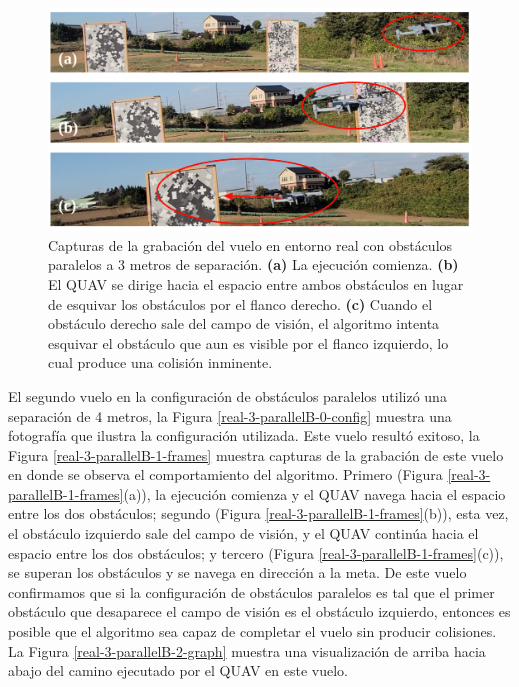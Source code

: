 \begin{figure}[H]
    \centering
    \includegraphics[scale=0.25]{partes/img/real-2-parallelA-1-frames.png}
    \caption[Capturas de la grabación del vuelo en entorno real con obstáculos paralelos a 3 metros de separación.]{Capturas de la grabación del vuelo en entorno real con obstáculos paralelos a 3 metros de separación. \textbf{(a)} La ejecución comienza. \textbf{(b)} El QUAV se dirige hacia el espacio entre ambos obstáculos en lugar de esquivar los obstáculos por el flanco derecho. \textbf{(c)} Cuando el obstáculo derecho sale del campo de visión, el algoritmo intenta esquivar el obstáculo que aun es visible por el flanco izquierdo, lo cual produce una colisión inminente.}
    \label{real-2-parallelA-1-frames}
\end{figure}

El segundo vuelo en la configuración de obstáculos paralelos utilizó una separación de 4 metros, la Figura \ref{real-3-parallelB-0-config} muestra una fotografía que ilustra la configuración utilizada. Este vuelo resultó exitoso, la Figura \ref{real-3-parallelB-1-frames} muestra capturas de la grabación de este vuelo en donde se observa el comportamiento del algoritmo. Primero (Figura \ref{real-3-parallelB-1-frames}(a)), la ejecución comienza y el QUAV navega hacia el espacio entre los dos obstáculos; segundo (Figura \ref{real-3-parallelB-1-frames}(b)), esta vez, el obstáculo izquierdo sale del campo de visión, y el QUAV continúa hacia el espacio entre los dos obstáculos; y tercero (Figura \ref{real-3-parallelB-1-frames}(c)), se superan los obstáculos y se navega en dirección a la meta. De este vuelo confirmamos que si la configuración de obstáculos paralelos es tal que el primer obstáculo que desaparece el campo de visión es el obstáculo izquierdo, entonces es posible que el algoritmo sea capaz de completar el vuelo sin producir colisiones. La Figura \ref{real-3-parallelB-2-graph} muestra una visualización de arriba hacia abajo del camino ejecutado por el QUAV en este vuelo.

